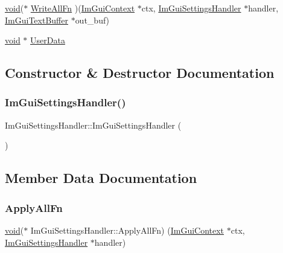 \begin{DoxyCompactItemize}
\item 
\hyperlink{imgui__impl__opengl3__loader_8h_ac668e7cffd9e2e9cfee428b9b2f34fa7}{void}($\ast$ \hyperlink{structImGuiSettingsHandler_a8f9d8923be4df1b5e6c17f9857b955f4}{Write\+All\+Fn} )(\hyperlink{structImGuiContext}{Im\+Gui\+Context} $\ast$ctx, \hyperlink{structImGuiSettingsHandler}{Im\+Gui\+Settings\+Handler} $\ast$handler, \hyperlink{structImGuiTextBuffer}{Im\+Gui\+Text\+Buffer} $\ast$out\+\_\+buf)
\item 
\hyperlink{imgui__impl__opengl3__loader_8h_ac668e7cffd9e2e9cfee428b9b2f34fa7}{void} $\ast$ \hyperlink{structImGuiSettingsHandler_a4e8dc5a10948568680764a3cdaf9b102}{User\+Data}
\end{DoxyCompactItemize}


\subsection{Constructor \& Destructor Documentation}
\mbox{\label{structImGuiSettingsHandler_ab84610a000c843d4e303e41e260fb1df}} 
\subsubsection{\texorpdfstring{Im\+Gui\+Settings\+Handler()}{ImGuiSettingsHandler()}}
{\footnotesize\ttfamily Im\+Gui\+Settings\+Handler\+::\+Im\+Gui\+Settings\+Handler (\begin{DoxyParamCaption}{ }\end{DoxyParamCaption})\hspace{0.3cm}{\ttfamily [inline]}}



\subsection{Member Data Documentation}
\mbox{\label{structImGuiSettingsHandler_a65f1fb45621d42fffcdec7dd09312c20}} 
\subsubsection{\texorpdfstring{Apply\+All\+Fn}{ApplyAllFn}}
{\footnotesize\ttfamily \hyperlink{imgui__impl__opengl3__loader_8h_ac668e7cffd9e2e9cfee428b9b2f34fa7}{void}($\ast$ Im\+Gui\+Settings\+Handler\+::\+Apply\+All\+Fn) (\hyperlink{structImGuiContext}{Im\+Gui\+Context} $\ast$ctx, \hyperlink{structImGuiSettingsHandler}{Im\+Gui\+Settings\+Handler} $\ast$handler)}

